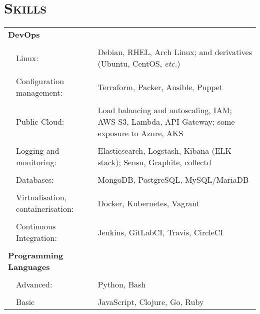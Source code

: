 \documentclass[a4paper,10pt]{article} %
\begin{document}
\section{\textsc{Skills}}
\begin{tabularx}{\textwidth}{p{0.3cm}|p{4cm}X}
\multicolumn{2}{l}{\textbf{DevOps}} & \\
\multicolumn{3}{c}{} \\ %
   & Linux:                              & Debian, RHEL, Arch Linux; and derivatives (Ubuntu, CentOS,
                                           \emph{etc.}) \\
     \\
   & Configuration management:           & Terraform, Packer, Ansible, Puppet \\
     \\
   & Public Cloud:                       & Load balancing and autoscaling, IAM; AWS S3, Lambda, API Gateway; some exposure to Azure, AKS\\
     \\
   & Logging and monitoring:             & Elasticsearch, Logstash, Kibana (ELK stack); Sensu, Graphite,
                                           collectd \\
     \\
   & Databases:                          & MongoDB, PostgreSQL, MySQL/MariaDB \\
     \\
   & Virtualisation, containerisation:   & Docker, Kubernetes, Vagrant \\
     \\
   & Continuous Integration:             & Jenkins, GitLabCI, Travis, CircleCI \\
\multicolumn{3}{c}{} \\ %
\multicolumn{2}{l}{\textbf{Programming Languages}}      & \\
\multicolumn{3}{c}{} \\ %
  &  Advanced:                           & Python, Bash \\
     \\
  &  Basic                               & JavaScript, Clojure, Go, Ruby \\
\end{tabularx}
\end{document}
